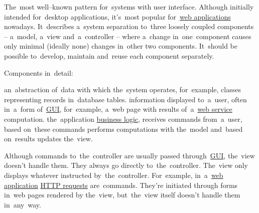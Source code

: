 \label{mvc}
The~most well--known pattern for~systems with user interface.
Although initially intended for~desktop applications, it's~most popular for~\hyperref[webserviceapplication]{web applications} nowadays.
It~describes a~system separation to~three loosely coupled components -- a~model, a~view and~a~controller -- where a~change in~one~component causes only minimal (ideally none) changes in~other two components.
It~should be possible to~develop, maintain and~reuse each component separately.
\newline

\noindent Components in~detail:
\begin{itemize}
     an~abstraction of~data with which the~system operates, for~example, classes representing records in~database tables.
     information displayed to~a~user, often in~a~form of~\hyperref[shellcligui]{GUI}, for~example, a~web page with results of~a~\hyperref[webserviceapplication]{web service} computation.
     the~application \hyperref[businesslogic]{business logic}, receives commands from~a~user, based on~these commands performs computations with the~model and~based on~results updates the~view.
\end{itemize}

\note Although commands to~the~controller are usually passed through~\hyperref[shellcligui]{GUI}, the~view doesn't handle them.
They always go directly to~the~controller.
The~view only displays whatever instructed by~the~controller.
For~example, in~a~\hyperref[webserviceapplication]{web application} \hyperref[http]{HTTP requests} are~commands.
They're initiated through forms in~web pages rendered by the~view, but~the~view itself doesn't handle them in~any~way.
\newpage

\begin{figure}[ht]
    \centering
\end{figure}


